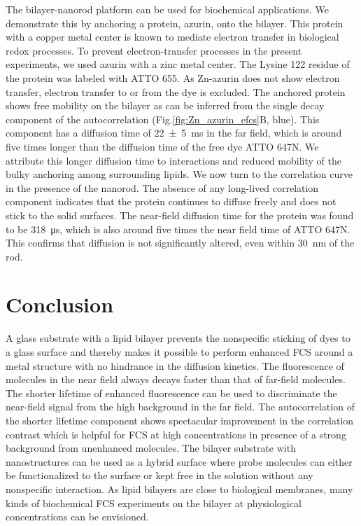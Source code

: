 The bilayer-nanorod platform can be used for biochemical applications.
We demonstrate this by anchoring a protein, azurin, onto the bilayer.
This protein with a copper metal center is known to mediate electron transfer in biological redox processes.\cite{kolczak2006azurin,Vijgenboom1997invivo}
To prevent electron-transfer processes in the present experiments, we used azurin with a zinc metal center.
The Lysine 122 residue of the protein was labeled with ATTO 655. 
As Zn-azurin does not show electron transfer, electron transfer to or from the dye is excluded.
The anchored protein shows free mobility on the bilayer as can be inferred from the single decay component of the autocorrelation (Fig.\ref{fig:Zn_azurin_efcs}B, blue).
This component has a diffusion time of \SI[separate-uncertainty = true]{22(5)}{\ms} in the far field, which is around five times longer than the diffusion time of the free dye ATTO 647N.
We attribute this longer diffusion time to interactions and reduced mobility of the bulky anchoring among surrounding lipids. 
We now turn to the correlation curve in the presence of the nanorod.
The absence of any long-lived correlation component indicates that the protein continues to diffuse freely and does not stick to the solid surfaces. 
The near-field diffusion time for the protein was found to be \SI{318}{\us}, which is also around five times the near field time of ATTO 647N.
This confirms that diffusion is not significantly altered, even within \SI{30}{\nm} of the rod.

\section{Conclusion}
A glass substrate with a lipid bilayer prevents the nonspecific sticking of dyes to a glass surface and thereby makes it possible to perform enhanced FCS around a metal structure with no hindrance in the diffusion kinetics.
The fluorescence of molecules in the near field always decays faster than that of far-field molecules.
The shorter lifetime of enhanced fluorescence can be used to discriminate the near-field signal from the high background in the far field.
The autocorrelation of the shorter lifetime component shows spectacular improvement in the correlation contrast which is helpful for FCS at high concentrations in presence of a strong background from unenhanced molecules.
The bilayer substrate with nanostructures can be used as a hybrid surface where probe molecules can either be functionalized to the surface or kept free in the solution without any nonspecific interaction.
As lipid bilayers are close to biological membranes, many kinds of biochemical FCS experiments on the bilayer at physiological concentrations can be envisioned.

